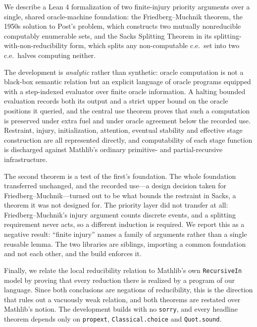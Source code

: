 We describe a Lean 4 formalization of two finite-injury priority arguments
over a single, shared oracle-machine foundation: the Friedberg--Muchnik
theorem, the 1950s solution to Post's problem, which constructs two mutually
nonreducible computably enumerable sets, and the Sacks Splitting Theorem in
its splitting-with-non-reducibility form, which splits any non-computable
c.e.\ set into two c.e.\ halves computing neither.

The development is \emph{analytic} rather than synthetic: oracle
computation is not a black-box semantic relation but an explicit language
of oracle programs equipped with a step-indexed evaluator over finite
oracle information.  A halting bounded evaluation records both its output
and a strict upper bound on the oracle positions it queried, and the
central use theorem proves that such a computation is preserved under extra
fuel and under oracle agreement below the recorded use.  Restraint,
injury, initialization, attention, eventual stability and effective stage
construction are all represented directly, and computability of each stage
function is discharged against Mathlib's ordinary primitive- and
partial-recursive infrastructure.

The second theorem is a test of the first's foundation.  The whole
foundation transferred unchanged, and the recorded use---a design decision
taken for Friedberg--Muchnik---turned out to be what bounds the restraint
in Sacks, a theorem it was not designed for.  The priority layer did not
transfer at all: Friedberg--Muchnik's injury argument counts discrete
events, and a splitting requirement never acts, so a different induction is
required.  We report this as a negative result: ``finite injury'' names a
family of arguments rather than a single reusable lemma.  The two libraries
are siblings, importing a common foundation and not each other, and the
build enforces it.

Finally, we relate the local reducibility relation to Mathlib's own
\texttt{RecursiveIn} model by proving that every reduction there is
realized by a program of our language.  Since both conclusions are
negations of reducibility, this is the direction that rules out a
vacuously weak relation, and both theorems are restated over Mathlib's
notion.  The development builds with no \texttt{sorry}, and every headline
theorem depends only on \texttt{propext}, \texttt{Classical.choice} and
\texttt{Quot.sound}.
